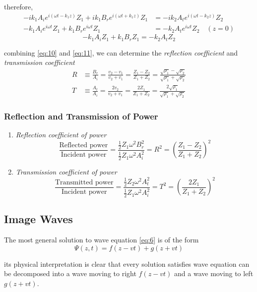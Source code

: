 \documentclass[openany]{book}
\begin{document}
therefore,
\begin{align*}
-ik_1A_ie^{i(\omega t-k_1z)}Z_1+ik_1B_re^{i(\omega t+k_1z)}Z_1&=-ik_2A_te^{i(\omega t-k_2z)}Z_2\\
-k_1A_ie^{i\omega t}Z_1+k_1B_re^{i\omega t}Z_1&=-k_2A_te^{i\omega t}Z_2\quad (z=0)
\end{align*}
\begin{equation}\label{eq:11}
-k_1A_iZ_1+k_1B_rZ_1=-k_2A_tZ_2
\end{equation}

combining \eqref{eq:10} and \eqref{eq:11}, we can determine the \emph{reflection coefficient} and \emph{transmission coefficient}
\begin{align*}
R&\equiv \frac{B_r}{A_i}=\frac{v_2-v_1}{v_2+v_1}=\frac{Z_1-Z_2}{Z_1+Z_2}=\frac{\sqrt{\rho _1}-\sqrt{\rho _2}}{\sqrt{\rho _1}+\sqrt{\rho _2}}\\
T&\equiv \frac{A_t}{A_i}=\frac{2v_2}{v_2+v_1}=\frac{2Z_1}{Z_1+Z_2}=\frac{2\sqrt{\rho _1}}{\sqrt{\rho _1}+\sqrt{\rho _2}}
\end{align*}
\subsubsection{Reflection and Transmission of Power}
\begin{enumerate}
\item \emph{Reflection coefficient of power}
\[\frac{\text{Reflected power}}{\text{Incident power}}=\frac{\frac{1}{2}Z_1\omega ^2B_r^2}{\frac{1}{2}Z_1\omega ^2A_i^2}=R^2=\left(\frac{Z_1-Z_2}{Z_1+Z_2}\right)^2\]
\item \emph{Transmission coefficient of power}
\[\frac{\text{Transmitted power}}{\text{Incident power}}=\frac{\frac{1}{2}Z_2\omega ^2A_t^2}{\frac{1}{2}Z_1\omega ^2A_i^2}=T^2=\left(\frac{2Z_1}{Z_1+Z_2}\right)^2\]
\end{enumerate}
\subsection{Image Waves}
The most general solution to wave equation  \eqref{eq:6} is of the form
\[\Psi (z,t)=f(z-vt)+g(z+vt)\]

its physical interpretation is clear that every solution satisfies wave equation can be decomposed into a wave moving to right $f(z-vt)$ and a wave moving to left $g(z+vt)$.
\end{document}
